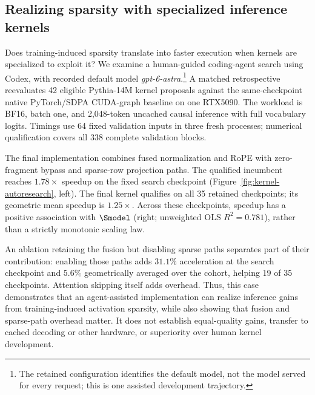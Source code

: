 \subsection{Realizing sparsity with specialized inference kernels}
\label{sec:kernel-autoresearch}

Does training-induced sparsity translate into faster execution when kernels
are specialized to exploit it? We examine a human-guided coding-agent search
using Codex, with recorded default model \emph{gpt-6-astra}.\footnote{The
retained configuration identifies the default model, not the model served
for every request; this is one assisted development trajectory.}
A matched retrospective reevaluates 42 eligible Pythia-14M kernel proposals
against the same-checkpoint native PyTorch/SDPA CUDA-graph baseline on one
RTX5090. The workload is BF16, batch one, and 2,048-token uncached causal
inference with full vocabulary logits. Timings use 64 fixed validation
inputs in three fresh processes; numerical qualification covers all
338 complete validation blocks.

The final implementation combines fused normalization and RoPE with
zero-fragment bypass and sparse-row projection paths.
The qualified incumbent reaches $1.78\times$ speedup on the fixed search
checkpoint (Figure~\ref{fig:kernel-autoresearch}, left). The final kernel
qualifies on all 35 retained checkpoints; its geometric mean speedup is
$1.25\times$. Across these checkpoints, speedup has a positive association
with $\Smodel$ (right; unweighted OLS $R^2=0.781$), rather than a strictly
monotonic scaling law.

An ablation retaining the fusion but disabling sparse paths separates part
of their contribution: enabling those paths adds $31.1\%$ acceleration at
the search checkpoint and $5.6\%$ geometrically averaged over the cohort,
helping 19 of 35 checkpoints. Attention skipping itself adds overhead.
Thus, this case demonstrates that an agent-assisted implementation can
realize inference gains from training-induced activation sparsity, while
also showing that fusion and sparse-path overhead matter. It does not
establish equal-quality gains, transfer to cached decoding or other hardware,
or superiority over human kernel development.

